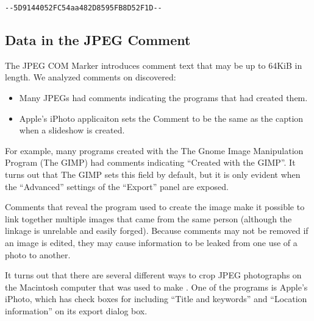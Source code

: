 \begin{lstlisting}[caption={A 40-character block of text consisting of
    two dashes, a 128-bit string (32 hexadecimal
    numbers), two more dashes, a carriage return and a line feed were
    found at the end of every photo taken with a Nokia Lumia 822
    cellular phone. Is this a serial number?},label=lumia822]
--5D9144052FC54aa482D8595FB8D52F1D--
\end{lstlisting}

\subsection{Data in the JPEG Comment}

The JPEG COM Marker introduces comment text that may be up to 64KiB in
length. We analyzed comments on discovered:

\begin{itemize}
\item Many JPEGs had comments indicating the programs that had created
  them. 
\item Apple's iPhoto applicaiton sets the Comment to be the same as
  the caption when a slideshow is created.
\end{itemize}

For example, many programs created with the The Gnome Image Manipulation
Program (The GIMP) had comments indicating ``Created with the
GIMP''. It turns out that The GIMP sets this field by default, but it
is only evident when the ``Advanced'' settings of the ``Export'' panel
are exposed.

Comments that reveal the program used to create the image make it
possible to link together multiple images that came from the same
person (although the linkage is unrelable and easily forged). Because
comments may not be removed if an image is edited, they may cause
information to be leaked from one use of a photo to another. 


It turns out that there are several different ways to crop JPEG
photographs on the Macintosh computer that was used to make
. One of the programs is Apple's iPhoto, which has
check boxes for including ``Title and keywords'' and ``Location
information'' on its export dialog box. 





